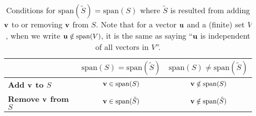 \begin{table}[ht!]
    \begin{center}
    \begin{tabular}{@{}lcc@{}}
	\toprule
	                               & \multicolumn{1}{c}{\textbf{$\mathrm{span}(S)=\mathrm{span}(\tilde S)$}} & \multicolumn{1}{c}{\textbf{$\mathrm{span}(S)\ne\mathrm{span}(\tilde S)$}} \\ \midrule
	\textbf{Add ${\bf v}$ to $S$}      & ${\bf v}\in\mathrm{span}(S)$                                                & ${\bf v}\notin\mathrm{span}(S)$                                               \\
	\textbf{Remove ${\bf v}$ from $S$} & ${\bf v}\in\mathrm{span}(\tilde S)$                                         & ${\bf v}\notin\mathrm{span}(\tilde S)$                                        \\ \bottomrule
	\end{tabular}
    \caption{Conditions for $\mathrm{span}(\tilde S) = \mathrm{span}(S)$ where $\tilde S$ is resulted from adding ${\bf v}$ to or removing ${\bf v}$ from $S$. Note that for a vector ${\bf u}$ and a (finite) set $V$, when we write ${\bf u}\notin\mathrm{span}(V)$, it is the same as saying ``${\bf u}$ is independent of all vectors in $V$''.}
    \end{center}
\end{table}

